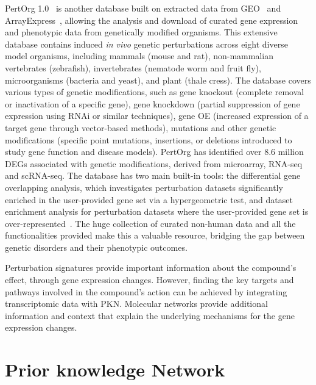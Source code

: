 PertOrg 1.0~\cite{RN85} is another database built on extracted data from \gls{GEO}~\cite{RN98} and ArrayExpress~\cite{RN122}, allowing the analysis and download of curated gene expression and phenotypic data from genetically modified organisms. 
This extensive database contains induced \textit{in vivo} genetic perturbations across eight diverse model organisms, including mammals (mouse and rat), non-mammalian vertebrates (zebrafish), invertebrates (nematode worm and fruit fly), microorganisms (bacteria and yeast), and plant (thale cress). The database covers various types of genetic modifications, such as gene knockout (complete removal or inactivation of a specific gene), gene knockdown (partial suppression of gene expression using \gls{RNA}i or similar techniques), gene \gls{OE} (increased expression of a target gene through vector-based methods), mutations and other genetic modifications (specific point mutations, insertions, or deletions introduced to study gene function and disease models). 
PertOrg has identified over 8.6 million \gls{DEGs} associated with genetic modifications, derived from microarray, \gls{RNA-seq} and \gls{scRNA-seq}. 
The database has two main built-in tools: the differential gene overlapping analysis, which investigates perturbation datasets significantly enriched in the user-provided gene set via a hypergeometric test, and dataset enrichment analysis for perturbation datasets where the user-provided gene set is over-represented~\cite{RN85}. 
The huge collection of curated non-human data and all the functionalities provided make this a valuable resource, bridging the gap between genetic disorders and their phenotypic outcomes.

Perturbation signatures provide important information about the compound's effect, through gene expression changes.
However, finding the key targets and pathways involved in the compound's action can be achieved by integrating transcriptomic data with \gls{PKN}. \gls{Molecular network}s provide additional information and context that explain the underlying mechanisms for the gene expression changes.

\section{Prior knowledge Network} %
\label{sec:PriorknowledgeNetwork}


